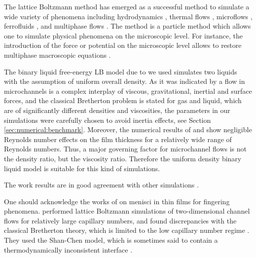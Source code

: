 \documentclass[preprint,12pt]{elsarticle}
\begin{document}
The lattice Boltzmann method has emerged as a successful method to simulate
a wide variety of phenomena including hydrodynamics \cite{yu}, thermal flows
\cite{karlin-minimalmodels}, microflows \cite{ansumali-small-knudsen},
ferrofluids \cite{kuzmin-aniso}, and multiphase flows
\cite{swift,Shan-chen:extended}. The method is a particle method which allows one to simulate physical
phenomena on the microscopic level. For instance, the introduction of the force or potential on the
microscopic level allows to restore multiphase macroscopic equations \cite{swift,
Shan-chen:extended}.

The binary liquid free-energy LB model due to \citet{swift} we used
simulates two liquids with the assumption of uniform overall
density. As it was indicated by \citet{gupta-review} a flow in microchannels is a complex
interplay of viscous, gravitational, inertial and surface forces, and the classical Bretherton
problem is stated for gas and liquid, which are of
significantly
different densities and viscosities, the parameters in our simulations were carefully chosen to
avoid  inertia
effects, see Section \ref{sec:numerical:benchmark}. Moreover, the numerical results of
\citet{giavedoni-numerical} and \citet{heil-bretherton} show
negligible Reynolds number effects on the film thickness for a relatively wide range of Reynolds
numbers. Thus, a major governing factor for microchannel flows is not the density ratio, but
the
viscosity ratio. Therefore the uniform density binary liquid model is suitable for this kind of
simulations.

The work results are in good agreement with other simulations \cite{heil-threedim,wang-non-circular}.

One should acknowledge the works of \citet{pagonabarraga-fingers} on menisci
in thin films for fingering phenomena. \citet{sehgal-microchannel} performed lattice Boltzmann
simulations of two-dimensional channel flows for relatively large capillary numbers, and
found discrepancies with the classical Bretherton theory, which
is limited to the low capillary number regime \cite{giavedoni-numerical}. They used the Shan-Chen model,
 which is sometimes said to contain a thermodynamically
inconsistent interface \cite{nourgaliev-breakup}. 
\end{document}
